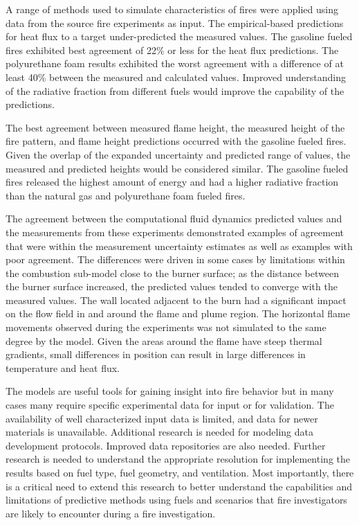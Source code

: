 \documentclass[twoside]{uocthesis}
\begin{document}
{A range of methods used to simulate characteristics of fires were applied using data from the source fire experiments as input.  The empirical-based predictions for heat flux to a target under-predicted the measured values.  The gasoline fueled fires exhibited best agreement of 22\% or less for the heat flux predictions.  The polyurethane foam results exhibited the worst agreement with a difference of at least 40\% between the measured and calculated values.  Improved understanding of the radiative fraction from different fuels would improve the capability of the predictions.  

The best agreement between measured flame height, the measured height of the fire pattern, and flame height predictions occurred with the gasoline fueled fires.  Given the overlap of the expanded uncertainty and predicted range of values, the measured and predicted heights would be considered similar.  The gasoline fueled fires released the highest amount of energy and had a higher radiative fraction than the natural gas and polyurethane foam fueled fires.  

The agreement between the computational fluid dynamics predicted values and the measurements from these experiments demonstrated examples of agreement that were within the measurement uncertainty estimates as well as examples with poor agreement.  The differences were driven in some cases by limitations within the combustion sub-model close to the burner surface; as the distance between the burner surface increased, the predicted values tended to converge with the measured values.  The wall located adjacent to the burn had a significant impact on the flow field in and around the flame and plume region.  The horizontal flame movements observed during the experiments was not simulated to the same degree by the model.  Given the areas around the flame have steep thermal gradients, small differences in position can result in large differences in temperature and heat flux.      

The models are useful tools for gaining insight into fire behavior but in many cases many require specific experimental data for input or for validation. The availability of well characterized input data is limited, and data for newer materials is unavailable. Additional research is needed for modeling data development protocols.  Improved data repositories are also needed. Further research is needed to understand the appropriate resolution for implementing the results based on fuel type, fuel geometry, and ventilation.  Most importantly, there is a critical need to extend this research to better understand the capabilities and limitations of predictive methods using fuels and scenarios that fire investigators are likely to encounter during a fire investigation.  
}
\end{document}
